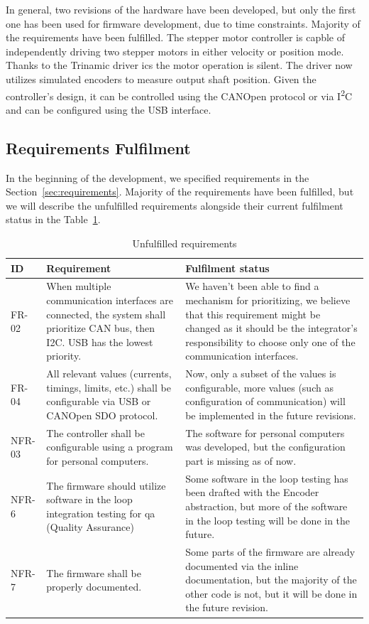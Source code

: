 In general, two revisions of the hardware have been developed, but only the first one has been used for firmware development, due to time constraints.
Majority of the requirements have been fulfilled.
The stepper motor controller is capble of independently driving two stepper motors in either velocity or position mode.
Thanks to the Trinamic driver \acs{ic}s the motor operation is silent.
The driver now utilizes simulated encoders to measure output shaft position.
Given the controller's design, it can be controlled using the CANOpen protocol or via I\textsuperscript{2}C and can be configured using the USB interface.

\subsection{Requirements Fulfilment}
\label{subsec:req_fulfilment}
In the beginning of the development, we specified requirements in the Section~\ref{sec:requirements}.
Majority of the requirements have been fulfilled, but we will describe the unfulfilled requirements alongside their current fulfilment status in the Table~\ref{tab:unfulfilled_req}.

\begin{table}[H]
    \centering
    \begin{tabular}{ |p{2cm}|p{6cm}|p{6cm}| }
        \hline
        ID & Requirement & Fulfilment status \\
        \hline
        \hline
        FR-02 & When multiple communication interfaces are connected, the system shall prioritize CAN bus, then I2C. USB has the lowest priority. & We haven't been able to find a mechanism for prioritizing, we believe that this requirement might be changed as it should be the integrator's responsibility to choose only one of the communication interfaces. \\
        \hline
        FR-04 & All relevant values (currents, timings, limits, etc.) shall be configurable via USB or CANOpen SDO protocol. & Now, only a subset of the values is configurable, more values (such as configuration of communication) will be implemented in the future revisions. \\
        \hline
        NFR-03 & The controller shall be configurable using a program for personal computers. & The software for personal computers was developed, but the configuration part is missing as of now. \\
        \hline
        NFR-6 & The firmware should utilize software in the loop integration testing for \acs{qa} (\acl{Quality Assurance}) & Some software in the loop testing has been drafted with the Encoder abstraction, but more of the software in the loop testing will be done in the future.\\
        \hline
        NFR-7 & The firmware shall be properly documented. & Some parts of the firmware are already documented via the inline documentation, but the majority of the other code is not, but it will be done in the future revision. \\
        \hline
    \end{tabular}
    \caption{Unfulfilled requirements}
    \label{tab:unfulfilled_req}
\end{table}

